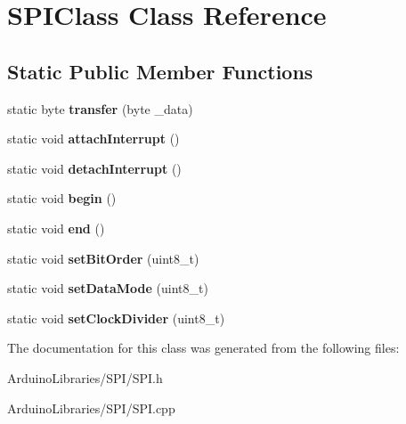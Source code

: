 \hypertarget{class_s_p_i_class}{}\section{S\+P\+I\+Class Class Reference}
\label{class_s_p_i_class}
\subsection*{Static Public Member Functions}
\begin{DoxyCompactItemize}
\item 
\hypertarget{class_s_p_i_class_a821dccd5dda20ccd9093fc35cce74ae5}{}static byte {\bfseries transfer} (byte \+\_\+data)\label{class_s_p_i_class_a821dccd5dda20ccd9093fc35cce74ae5}

\item 
\hypertarget{class_s_p_i_class_a715dff0f3f87dbb64b2ef83d15ee97c0}{}static void {\bfseries attach\+Interrupt} ()\label{class_s_p_i_class_a715dff0f3f87dbb64b2ef83d15ee97c0}

\item 
\hypertarget{class_s_p_i_class_abf83d2ea70e46aed0dd278011e1e8741}{}static void {\bfseries detach\+Interrupt} ()\label{class_s_p_i_class_abf83d2ea70e46aed0dd278011e1e8741}

\item 
\hypertarget{class_s_p_i_class_a4a2646959a242f6af423b04734c003f0}{}static void {\bfseries begin} ()\label{class_s_p_i_class_a4a2646959a242f6af423b04734c003f0}

\item 
\hypertarget{class_s_p_i_class_a79d89d8e3f5f1b003cb7b0aed2d77eab}{}static void {\bfseries end} ()\label{class_s_p_i_class_a79d89d8e3f5f1b003cb7b0aed2d77eab}

\item 
\hypertarget{class_s_p_i_class_aa50f88614cda319d2d983749b9a7626d}{}static void {\bfseries set\+Bit\+Order} (uint8\+\_\+t)\label{class_s_p_i_class_aa50f88614cda319d2d983749b9a7626d}

\item 
\hypertarget{class_s_p_i_class_ae7e89ec7f26a6412fb2d218db331195d}{}static void {\bfseries set\+Data\+Mode} (uint8\+\_\+t)\label{class_s_p_i_class_ae7e89ec7f26a6412fb2d218db331195d}

\item 
\hypertarget{class_s_p_i_class_ac364a8e46c27d1f6d94a58e9a2455c62}{}static void {\bfseries set\+Clock\+Divider} (uint8\+\_\+t)\label{class_s_p_i_class_ac364a8e46c27d1f6d94a58e9a2455c62}

\end{DoxyCompactItemize}


The documentation for this class was generated from the following files\+:\begin{DoxyCompactItemize}
\item 
Arduino\+Libraries/\+S\+P\+I/S\+P\+I.\+h\item 
Arduino\+Libraries/\+S\+P\+I/S\+P\+I.\+cpp\end{DoxyCompactItemize}
